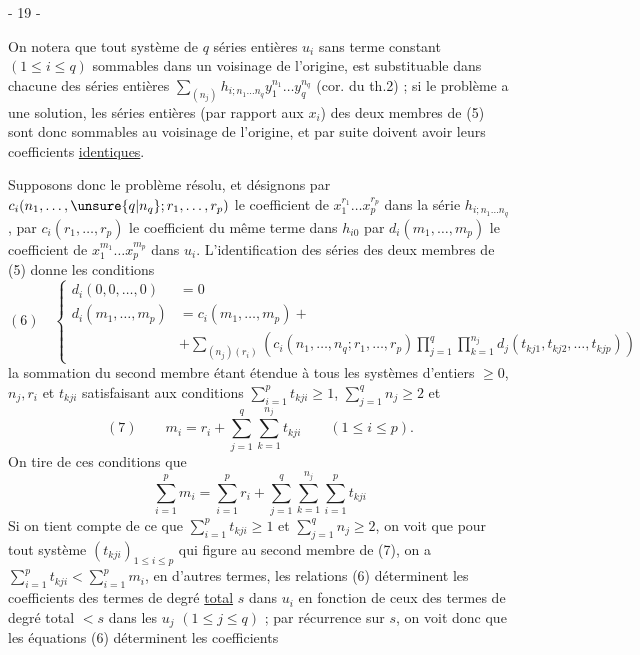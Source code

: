 \begin{center}
- 19 -
\end{center}

On notera que tout système de $q$ séries entières $u_i$ sans terme constant
$(1\leq i\leq q)$ sommables dans un voisinage de l'origine, est substituable
dans chacune des séries entières
$\sum_{(n_j)}h_{i;n_1\ldots n_q}y_1^{n_1}\ldots y_q^{n_q}$
(cor. du th.2) ; si le problème a une solution, les séries entières
(par rapport aux $x_i$) des deux membres de (5) sont donc sommables au voisinage
de l'origine, et par suite doivent avoir leurs coefficients \uline{identiques}.

Supposons donc le problème résolu, et désignons par
$c_i(n_1,\ldots,\unsure{q|n_q};r_1,\ldots,r_p)$ le coefficient de
$x_1^{r_1}\ldots x_p^{r_p}$ dans la série $h_{i;n_1\ldots n_q}$,
par $c_i(r_1,\ldots,r_p)$ le coefficient du même terme dans $h_{i0}$
par $d_i(m_1,\ldots,m_p)$ le coefficient de $x_1^{m_1}\ldots x_p^{m_p}$
dans $u_i$. L'identification des séries des deux membres de (5) donne les conditions
\[
(6)\quad
\left\{\begin{aligned}
d_i(0,0,\ldots,0)&=0\\
d_i(m_1,\ldots,m_p)&=c_i(m_1,\ldots,m_p)+\\
&+\sum_{(n_j)(r_i)}
\left(c_i(n_1,\ldots,n_q;r_1,\ldots,r_p)
\prod_{j=1}^q\prod_{k=1}^{n_j}d_j(t_{kj1},t_{kj2},\ldots,t_{kjp})\right)
\end{aligned}\right.
\]
la sommation du second membre étant étendue à tous les systèmes d'entiers
$\geq0$, $n_j,r_i$ et $t_{kji}$ satisfaisant aux conditions
$\sum_{i=1}^p t_{kji}\geq1$, $\sum_{j=1}^q n_j\geq2$ et
\[
(7)\qquad
m_i=r_i+\sum_{j=1}^q\sum_{k=1}^{n_j}t_{kji}
\qquad(1\leq i\leq p).
\]
On tire de ces conditions que
\[
\sum_{i=1}^p m_i=\sum_{i=1}^p r_i+
\sum_{j=1}^q\sum_{k=1}^{n_j}\sum_{i=1}^p t_{kji}
\]
Si on tient compte de ce que $\sum_{i=1}^p t_{kji}\geq1$
et $\sum_{j=1}^q n_j\geq2$, on voit que pour tout système
$(t_{kji})_{1\leq i\leq p}$ qui figure au second membre de (7),
on a $\sum_{i=1}^p t_{kji}<\sum_{i=1}^p m_i$, en d'autres termes,
les relations (6) déterminent les coefficients des termes de degré
\uline{total} $s$ dans $u_i$ en fonction de ceux des termes de degré total
$<s$ dans les $u_j$ $(1\leq j\leq q)$ ; par récurrence sur $s$,
on voit donc que les équations (6) déterminent les coefficients
